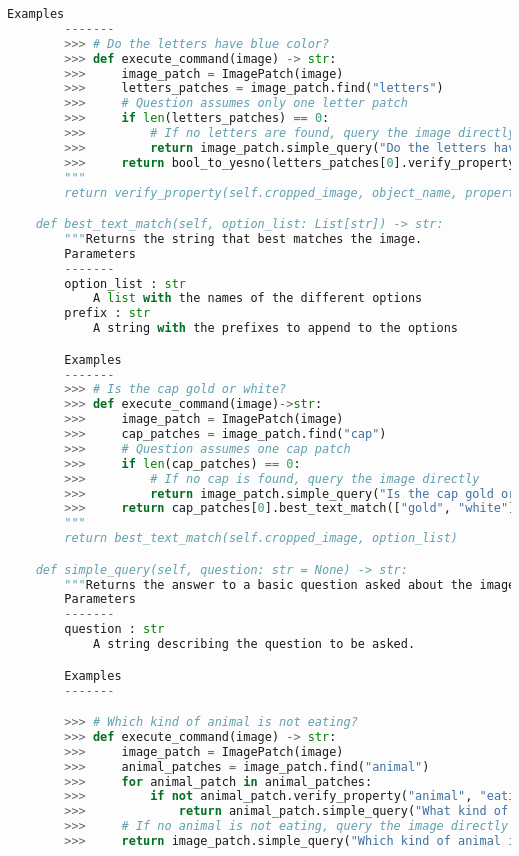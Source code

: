 \documentclass[10pt,twocolumn,letterpaper]{article}
\begin{document}
\begin{lstlisting}[language=Python, xleftmargin=.0\textwidth, xrightmargin=.0\textwidth, caption=\textbf{Full API.}, label={listing}]
        Examples
        -------
        >>> # Do the letters have blue color?
        >>> def execute_command(image) -> str:
        >>>     image_patch = ImagePatch(image)
        >>>     letters_patches = image_patch.find("letters")
        >>>     # Question assumes only one letter patch
        >>>     if len(letters_patches) == 0:
        >>>         # If no letters are found, query the image directly
        >>>         return image_patch.simple_query("Do the letters have blue color?")
        >>>     return bool_to_yesno(letters_patches[0].verify_property("letters", "blue"))
        """
        return verify_property(self.cropped_image, object_name, property)

    def best_text_match(self, option_list: List[str]) -> str:
        """Returns the string that best matches the image.
        Parameters
        -------
        option_list : str
            A list with the names of the different options
        prefix : str
            A string with the prefixes to append to the options

        Examples
        -------
        >>> # Is the cap gold or white?
        >>> def execute_command(image)->str:
        >>>     image_patch = ImagePatch(image)
        >>>     cap_patches = image_patch.find("cap")
        >>>     # Question assumes one cap patch
        >>>     if len(cap_patches) == 0:
        >>>         # If no cap is found, query the image directly
        >>>         return image_patch.simple_query("Is the cap gold or white?")
        >>>     return cap_patches[0].best_text_match(["gold", "white"])
        """
        return best_text_match(self.cropped_image, option_list)

    def simple_query(self, question: str = None) -> str:
        """Returns the answer to a basic question asked about the image. If no question is provided, returns the answer to "What is this?".
        Parameters
        -------
        question : str
            A string describing the question to be asked.

        Examples
        -------

        >>> # Which kind of animal is not eating?
        >>> def execute_command(image) -> str:
        >>>     image_patch = ImagePatch(image)
        >>>     animal_patches = image_patch.find("animal")
        >>>     for animal_patch in animal_patches:
        >>>         if not animal_patch.verify_property("animal", "eating"):
        >>>             return animal_patch.simple_query("What kind of animal is eating?") # crop would include eating so keep it in the query
        >>>     # If no animal is not eating, query the image directly
        >>>     return image_patch.simple_query("Which kind of animal is not eating?")


\end{lstlisting}
\end{document}
